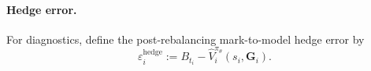 \documentclass[10pt,a4paper,reqno]{amsart}
\newcommand{\<}{\langle}
\renewcommand{\>}{\rangle}
\theoremstyle{example}
\begin{document}
\paragraph{Hedge error.}
For diagnostics, define the post-rebalancing mark-to-model hedge error by
\begin{equation}
\label{eq:hedge_error_impl}
\varepsilon_i^{\mathrm{hedge}}
:=
B_{t_i}
-
\widehat{V}_i^{\pi_\theta}(s_i,\mathbf{G}_i).
\end{equation}

\end{document}
